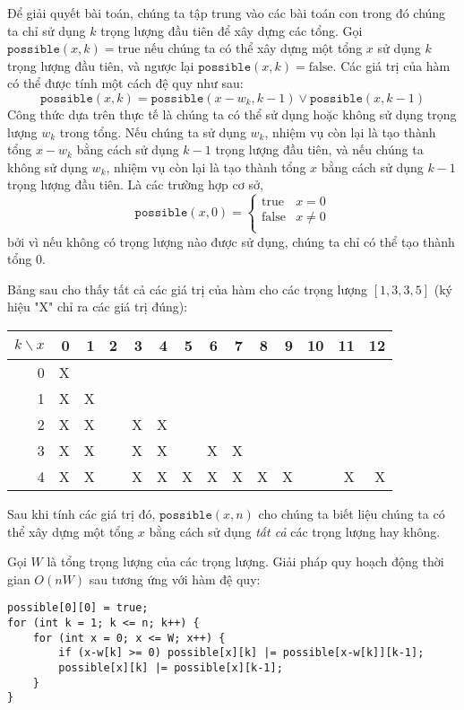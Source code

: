 Để giải quyết bài toán, chúng ta tập trung vào các bài toán con
trong đó chúng ta chỉ sử dụng $k$ trọng lượng đầu tiên
để xây dựng các tổng.
Gọi $\texttt{possible}(x,k)=\textrm{true}$ nếu
chúng ta có thể xây dựng một tổng $x$
sử dụng $k$ trọng lượng đầu tiên,
và ngược lại $\texttt{possible}(x,k)=\textrm{false}$.
Các giá trị của hàm có thể được tính
một cách đệ quy như sau:
\[ \texttt{possible}(x,k) = \texttt{possible}(x-w_k,k-1) \lor \texttt{possible}(x,k-1) \]
Công thức dựa trên thực tế là chúng ta có thể
sử dụng hoặc không sử dụng trọng lượng $w_k$ trong tổng.
Nếu chúng ta sử dụng $w_k$, nhiệm vụ còn lại là
tạo thành tổng $x-w_k$ bằng cách sử dụng $k-1$ trọng lượng đầu tiên,
và nếu chúng ta không sử dụng $w_k$,
nhiệm vụ còn lại là tạo thành tổng $x$
bằng cách sử dụng $k-1$ trọng lượng đầu tiên.
Là các trường hợp cơ sở,
\begin{equation*}
    \texttt{possible}(x,0) = \begin{cases}
               \textrm{true}    & x = 0\\
               \textrm{false}   & x \neq 0 \\
           \end{cases}
\end{equation*}
bởi vì nếu không có trọng lượng nào được sử dụng,
chúng ta chỉ có thể tạo thành tổng 0.

Bảng sau cho thấy tất cả các giá trị của hàm
cho các trọng lượng $[1,3,3,5]$ (ký hiệu "X"
chỉ ra các giá trị đúng):

\begin{center}
\begin{tabular}{r|rrrrrrrrrrrrr}
$k \backslash x$ & 0 & 1 & 2 & 3 & 4 & 5 & 6 & 7 & 8 & 9 & 10 & 11 & 12 \\
\hline
 0 & X & \\
 1 & X & X \\
 2 & X & X & & X & X \\
 3 & X & X & & X & X & & X & X \\
 4 & X & X & & X & X & X & X & X & X & X & & X & X \\
\end{tabular}
\end{center}

Sau khi tính các giá trị đó, $\texttt{possible}(x,n)$
cho chúng ta biết liệu chúng ta có thể xây dựng một
tổng $x$ bằng cách sử dụng \emph{tất cả} các trọng lượng hay không.

Gọi $W$ là tổng trọng lượng của các trọng lượng.
Giải pháp quy hoạch động thời gian $O(nW)$ sau
tương ứng với hàm đệ quy:
\begin{lstlisting}
possible[0][0] = true;
for (int k = 1; k <= n; k++) {
    for (int x = 0; x <= W; x++) {
        if (x-w[k] >= 0) possible[x][k] |= possible[x-w[k]][k-1];
        possible[x][k] |= possible[x][k-1];
    }
}
\end{lstlisting}

